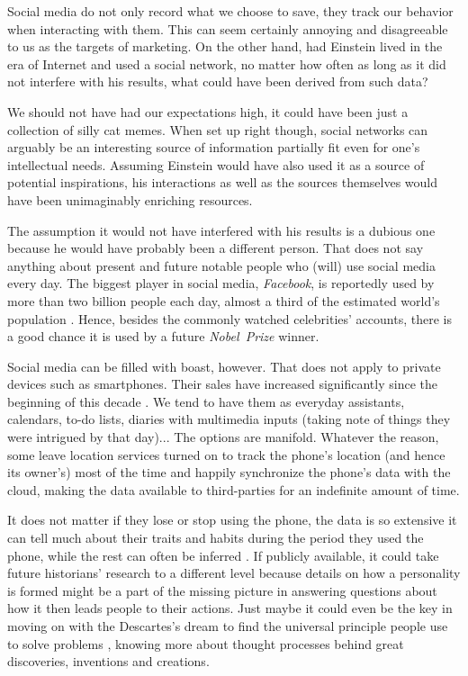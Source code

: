 \documentclass[a4paper]{article}
\begin{document}
Social media do not only record what we choose to save, they track our behavior when interacting with them. This can seem certainly annoying and disagreeable to us as the targets of marketing. 
On the other hand, had Einstein lived in the era of Internet and used a social network, no matter how often as long as it did not interfere with his results, what could have been derived from such data?

We should not have had our expectations high, it could have been just a collection of silly cat memes. When set up right though, social networks can arguably be an interesting source of information partially fit even for one's intellectual needs. Assuming Einstein would have also used it as a source of potential inspirations, his interactions as well as the sources themselves would have been unimaginably enriching resources.

The assumption it would not have interfered with his results is a dubious one because he would have probably been a different person. That does not say anything about present and future notable people who (will) use social media every day. 
The biggest player in social media, \textit{Facebook}, is reportedly used by more than two billion people each day, almost a third of the estimated world's population \cite{facebook, wp}. Hence, besides the commonly watched celebrities' accounts, there is a good chance it is used by a future \emph{Nobel~Prize} winner.

Social media can be filled with boast, however. That does not apply to private devices such as smartphones. Their sales have increased significantly since the beginning of this decade \cite{statista2}. We tend to have them as everyday assistants, calendars, to-do lists, diaries with multimedia inputs (taking note of things they were intrigued by that day)...  The options are manifold. 
Whatever the reason, some leave location services turned on to track the phone's location (and hence its owner's) most of the time and happily synchronize the phone's data with the cloud, making the data  available to third-parties for an indefinite amount of time. 

It does not matter if they lose or stop using the phone, the data is so extensive it can tell much about their traits and habits during the period they used the phone, while the rest can often be inferred \cite{quattrone}. If publicly available, it could take future historians' research to a different level because details on how a personality is formed might be a part of the missing picture in answering questions about how it then leads people to their actions. 
Just maybe it could even be the key in moving on with the Descartes's dream to find the universal principle people use to solve problems \cite{polya}, knowing more about thought processes behind great discoveries, inventions and creations.
\end{document}
